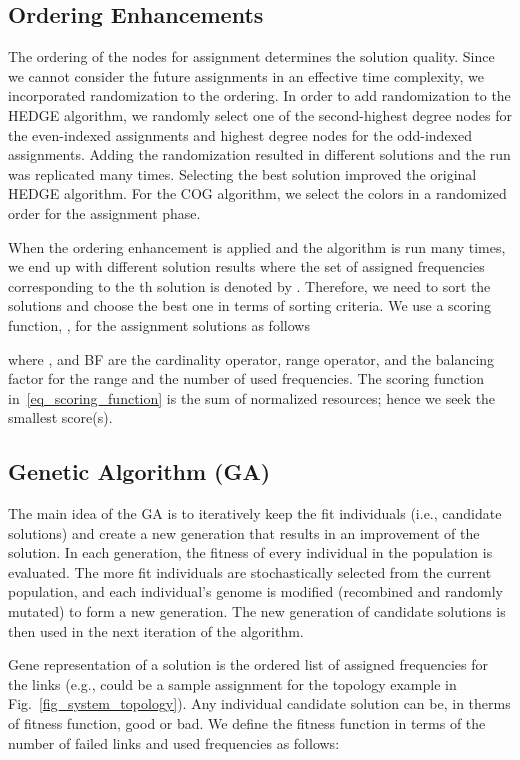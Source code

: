 \documentclass[10pt,twocolumn,twoside]{JCNtran}
\newcommand{\ith}{th}
\begin{document}
\subsection{Ordering Enhancements}
\label{subsec_ordering_enhancements}
The ordering of the nodes for assignment determines the solution quality. Since we cannot consider the future assignments in an effective time complexity, we incorporated randomization to the ordering. In order to add randomization to the HEDGE algorithm, we randomly select one of the second-highest degree nodes for the even-indexed assignments and highest degree nodes for the odd-indexed assignments. Adding the randomization resulted in different solutions and the run was replicated many times. Selecting the best solution improved the original HEDGE algorithm. For the COG algorithm, we select the colors in a randomized order for the assignment phase. 

When the ordering enhancement is applied and the algorithm is run many times, we end up with different solution results where the set of assigned frequencies corresponding to the \ith{} solution is denoted by . Therefore, we need to sort the solutions and choose the best one in terms of sorting criteria. We use a scoring function, , for the assignment solutions as follows

where ,  and BF are the cardinality operator, range operator, and the balancing factor for the range and the number of used frequencies. The scoring function in~\eqref{eq_scoring_function} is the sum of normalized resources; hence we seek the smallest score(s).



\subsection{Genetic Algorithm (GA)}
\label{subsec_genetic}
The main idea of the GA is to iteratively keep the fit individuals (i.e., candidate solutions) and create a new generation that results in an  improvement of the solution. In each generation, the fitness of every individual in the population is evaluated. The more fit individuals are stochastically selected from the current population, and each individual's genome is modified (recombined and randomly mutated) to form a new generation. The new generation of candidate solutions is then used in the next iteration of the algorithm. 

Gene representation of a solution is the ordered list of assigned frequencies for the links (e.g.,  could be a sample assignment for the topology example in Fig.~\ref{fig_system_topology}). Any individual candidate solution can be, in therms of fitness function, good or bad. We define the fitness function in terms of the number of failed links and used frequencies as follows:
\end{document}

